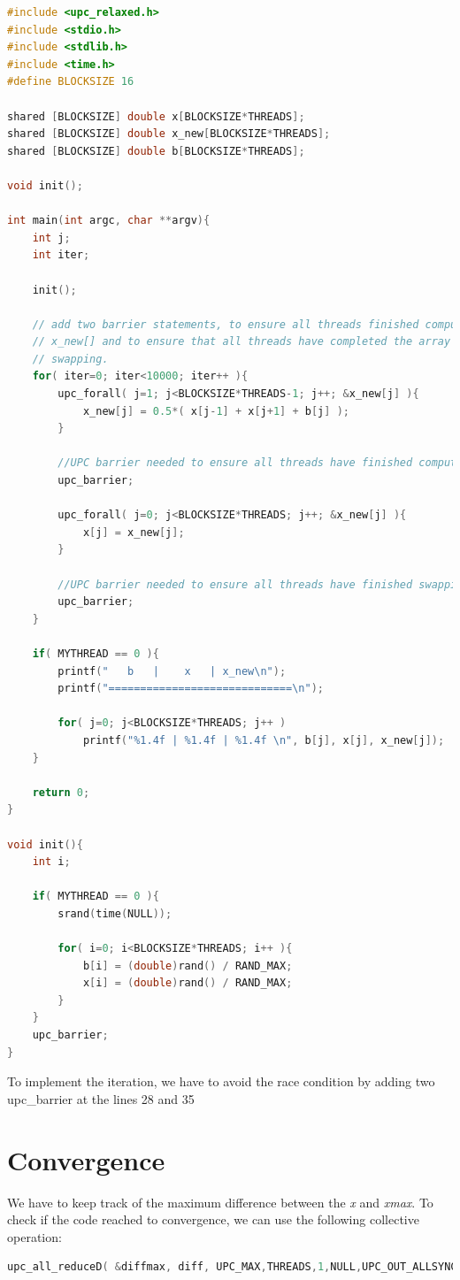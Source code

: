 \documentclass{report}
\begin{document}
\begin{lstlisting}[language=c]
#include <upc_relaxed.h>
#include <stdio.h>
#include <stdlib.h>
#include <time.h>
#define BLOCKSIZE 16

shared [BLOCKSIZE] double x[BLOCKSIZE*THREADS];
shared [BLOCKSIZE] double x_new[BLOCKSIZE*THREADS];
shared [BLOCKSIZE] double b[BLOCKSIZE*THREADS];

void init();

int main(int argc, char **argv){
    int j;
    int iter;

    init();

    // add two barrier statements, to ensure all threads finished computing
    // x_new[] and to ensure that all threads have completed the array
    // swapping.
    for( iter=0; iter<10000; iter++ ){
        upc_forall( j=1; j<BLOCKSIZE*THREADS-1; j++; &x_new[j] ){
            x_new[j] = 0.5*( x[j-1] + x[j+1] + b[j] );
        }

        //UPC barrier needed to ensure all threads have finished computing x_new[]
        upc_barrier;

        upc_forall( j=0; j<BLOCKSIZE*THREADS; j++; &x_new[j] ){
            x[j] = x_new[j];
        }

        //UPC barrier needed to ensure all threads have finished swapping x[] and x_new[]
        upc_barrier;
    }

    if( MYTHREAD == 0 ){
        printf("   b   |    x   | x_new\n");
        printf("=============================\n");

        for( j=0; j<BLOCKSIZE*THREADS; j++ )
            printf("%1.4f | %1.4f | %1.4f \n", b[j], x[j], x_new[j]);
    }

    return 0;
}

void init(){
    int i;

    if( MYTHREAD == 0 ){
        srand(time(NULL));

        for( i=0; i<BLOCKSIZE*THREADS; i++ ){
            b[i] = (double)rand() / RAND_MAX;
            x[i] = (double)rand() / RAND_MAX;
        }
    }
    upc_barrier;
}

\end{lstlisting}

To implement the iteration, we have to avoid the race condition by adding two upc\_barrier at the lines 28 and 35

\section{Convergence}
We have to keep track of the maximum difference between the \textit{x} and \textit{xmax}.
To check if the code reached to convergence, we can use the following collective operation:
\begin{lstlisting}[language=c]
upc_all_reduceD( &diffmax, diff, UPC_MAX,THREADS,1,NULL,UPC_OUT_ALLSYNC);
\end{lstlisting}
\end{document}
